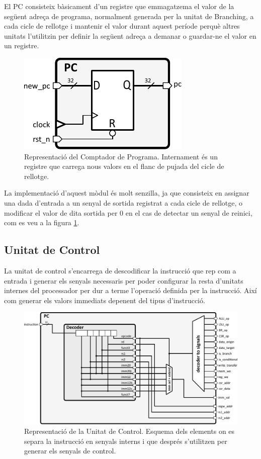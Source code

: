 \documentclass[10pt,a4paper,twocolumn,twoside]{article}
\begin{document}
    El PC consisteix bàsicament d'un registre que emmagatzema el valor de la següent adreça de programa, normalment generada per la unitat de Branching, a cada cicle de rellotge i mantenir el valor durant aquest període perquè altres unitats l'utilitzin per definir la següent adreça a demanar o guardar-ne el valor en un registre.
    
        \begin{figure}[!ht]
    \centering
    	\includegraphics[width=0.5\linewidth]{pdf/PC.pdf}
        \caption{Representació del Comptador de Programa. Internament és un registre que carrega nous valors en el flanc de pujada del cicle de rellotge.}
        \label{fig:PC}
    \end{figure}
    La implementació d'aquest mòdul és molt senzilla, ja que consisteix en assignar una dada d'entrada a un senyal de sortida registrat a cada cicle de rellotge, o modificar el valor de dita sortida per 0 en el cas de detectar un senyal de reinici, com es veu a la figura \ref{fig:PC}. 
    
    
    \subsection{Unitat de Control}
        La unitat de control s'encarrega de descodificar la instrucció que rep com a entrada i generar els senyals necessaris per poder configurar la resta d'unitats internes del processador per dur a terme l'operació definida per la instrucció. Així com generar els valors immediats depenent del tipus d'instrucció.  
        
    \begin{figure}[!ht]
    \centering
    	\includegraphics[width=\linewidth]{pdf/Control_Unit.pdf}
        \caption{Representació de la Unitat de Control. Esquema dels elements on es separa la instrucció en senyals interns i que després s'utilitzen per generar els senyals de control.}
        \label{fig:control}
    \end{figure}
    
\end{document}
